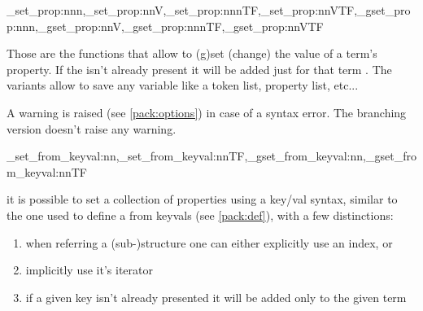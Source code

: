 \documentclass[10pt]{article}
\begin{document}
\begin{codedescribe}{\starray_set_prop:nnn,\starray_set_prop:nnV,\starray_set_prop:nnnTF,\starray_set_prop:nnVTF,\starray_gset_prop:nnn,\starray_gset_prop:nnV,\starray_gset_prop:nnnTF,\starray_gset_prop:nnVTF}
\begin{codesyntax}%
\end{codesyntax}
\end{codedescribe}
Those are the functions that allow to (g)set (change) the value of a term's property. If the  isn't already present it will be added just for that term . The  variants allow to save any variable like a token list, property list, etc...
\begin{tsremark}
A warning is raised (see \ref{pack:options}) in case of a  syntax error. The branching version doesn't raise any warning.
\end{tsremark}

\begin{codedescribe}{\starray_set_from_keyval:nn,\starray_set_from_keyval:nnTF,\starray_gset_from_keyval:nn,\starray_gset_from_keyval:nnTF}
\begin{codesyntax}%
\end{codesyntax}
\end{codedescribe}

it is possible to set a collection of properties using a key/val syntax, similar to the one used to define a  from keyvals (see \ref{pack:def}), with a few distinctions:
\begin{enumerate}
  \item when referring a (sub-)structure one can either explicitly use an index, or
  \item  implicitly use it's iterator 
  \item if a given key isn't already presented it will be added only to the given term
\end{enumerate}
\end{document}
